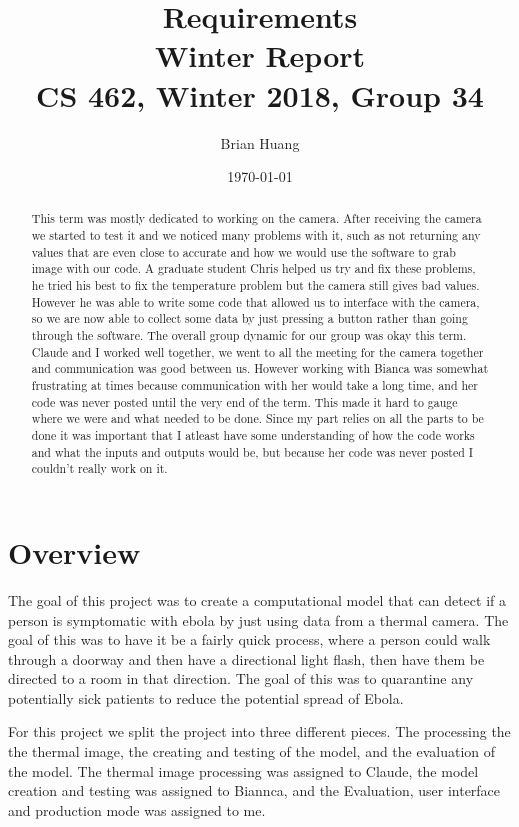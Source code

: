 \documentclass[onecolumn, draftclsnofoot,10pt, compsoc]{IEEEtran}
\title{%
  Requirements \\
  \vspace{0.4cm}
  \large Winter Report \\
  \vspace{0.4cm}
  \large CS 462, Winter 2018, Group 34\\
    }
\author{Brian Huang}
\date{\today}
\begin{document}
\maketitle

\begin{abstract}
	This term was mostly dedicated to working on the camera. After receiving the camera we started to test it and we noticed many problems with it, such as not returning any values that are even close to accurate and how we would use the software to grab image with our code. A graduate student Chris helped us try and fix these problems, he tried his best to fix the temperature problem but the camera still gives bad values. However he was able to write some code that allowed us to interface with the camera, so we are now able to collect some data by just pressing a button rather than going through the software. The overall group dynamic for our group was okay this term. Claude and I worked well together, we went to all the meeting for the camera together and communication was good between us. However working with Bianca was somewhat frustrating at times because communication with her would take a long time, and her code was never posted until the very end of the term. This made it hard to gauge where we were and what needed to be done. Since my part relies on all the parts to be done it was important that I atleast have some understanding of how the code works and what the inputs and outputs would be, but because her code was never posted I couldn’t really work on it.
\end{abstract}

\newpage

\newpage
\section{Overview}
The goal of this project was to create a computational model that can detect if a person is symptomatic with ebola by just using data from a thermal camera. The goal of this was to have it be a fairly quick process, where a person could walk through a doorway and then have a directional light flash, then have them be directed to a room in that direction. The goal of this was to quarantine any potentially sick patients to reduce the potential spread of Ebola.

For this project we split the project into three different pieces. The processing the the thermal image, the creating and testing of the model, and the evaluation of the model. The thermal image processing was assigned to Claude, the model creation and testing was assigned to Biannca, and the Evaluation, user interface and production mode was assigned to me. 
\end{document}

